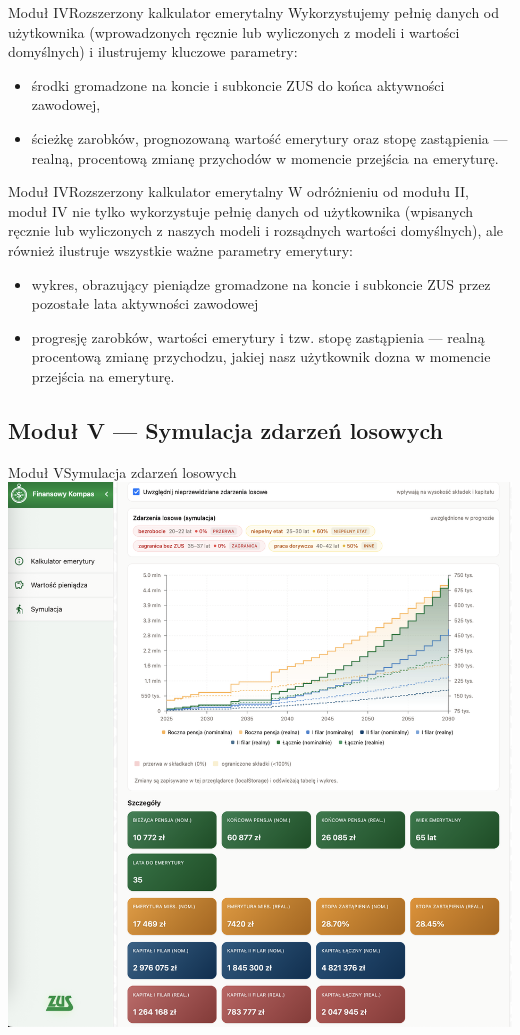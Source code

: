 \begin{frame}[t]{Moduł IV}{Rozszerzony kalkulator emerytalny}
Wykorzystujemy pełnię danych od użytkownika (wprowadzonych ręcznie lub wyliczonych z modeli i wartości domyślnych)
i ilustrujemy kluczowe parametry:
\begin{itemize}
  \pause
  \item środki gromadzone na koncie i subkoncie ZUS do końca aktywności zawodowej,
  \pause
  \item ścieżkę zarobków, prognozowaną wartość emerytury oraz stopę zastąpienia ---
        realną, procentową zmianę przychodów w momencie przejścia na emeryturę.
\end{itemize}
\end{frame}

\begin{frame}[t]{Moduł IV}{Rozszerzony kalkulator emerytalny}
W odróżnieniu od modułu II, moduł IV nie tylko wykorzystuje pełnię danych od użytkownika
(wpisanych ręcznie lub wyliczonych z naszych modeli i rozsądnych wartości domyślnych),
ale również ilustruje wszystkie ważne parametry emerytury:

\begin{itemize}
    \pause
    \item wykres, obrazujący pieniądze gromadzone na koncie i subkoncie ZUS przez pozostałe lata aktywności
    zawodowej
    \pause
    \item progresję zarobków, wartości emerytury i tzw. stopę zastąpienia --- realną procentową zmianę
    przychodzu, jakiej nasz użytkownik dozna w momencie przejścia na emeryturę.
\end{itemize}
\end{frame}

\subsection{Moduł V --- Symulacja zdarzeń losowych}

\begin{frame}[t]{Moduł V}{Symulacja zdarzeń losowych}
  \includegraphics[width=.8\textwidth]{img/module_5_random_events}
\end{frame}

